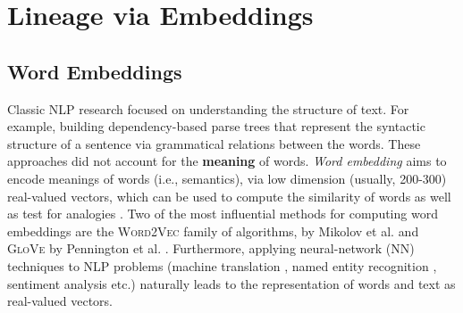 \chapter{Lineage via Embeddings}
\label{chap:lineage_embeddings}

\section{Word Embeddings}\label{sec:word_embeddings_intro}
Classic NLP research focused on understanding the structure of text. For example, building dependency-based parse trees \cite{melcuk1988, klein-manning-2004-corpus} that represent the syntactic structure of a sentence via grammatical relations between the words. These approaches did not account for the \textbf{meaning} of words. \textit{Word embedding} aims to encode meanings of words (i.e., semantics), via low dimension (usually, 200-300) real-valued vectors, which can be used to compute the similarity of words as well as test for analogies \cite{DBLP:conf/naacl/MikolovYZ13}. Two of the most influential methods for computing word embeddings are the \textsc{Word2Vec} family of algorithms, by Mikolov et al. \cite{DBLP:journals/corr/abs-1301-3781, DBLP:conf/nips/MikolovSCCD13} and \textsc{GloVe} by Pennington et al. \cite{pennington2014glove}. Furthermore, applying neural-network (NN) techniques to NLP problems (machine translation \cite{wu2016googles}, named entity recognition \cite{Gillick_2016}, sentiment analysis \cite{Maas:2011:LWV:2002472.2002491} etc.) naturally leads to the representation of words and text as real-valued vectors. 


